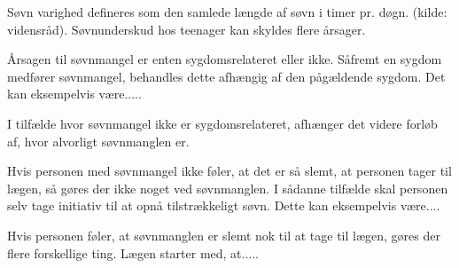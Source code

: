 

Søvn varighed defineres som den samlede længde af søvn i timer pr. døgn. (kilde: vidensråd). 
Søvnunderskud hos teenager kan skyldes flere årsager. 



Årsagen til søvnmangel er enten sygdomsrelateret eller ikke. Såfremt en sygdom medfører søvnmangel, behandles dette afhængig af den pågældende sygdom. Det kan eksempelvis være.....

I tilfælde hvor søvnmangel ikke er sygdomsrelateret, afhænger det videre forløb af, hvor alvorligt søvnmanglen er. 

Hvis personen med søvnmangel ikke føler, at det er så slemt, at personen tager til lægen, så gøres der ikke noget ved søvnmanglen. I sådanne tilfælde skal personen selv tage initiativ til at opnå tilstrækkeligt søvn. Dette kan eksempelvis være....

Hvis personen føler, at søvnmanglen er slemt nok til at tage til lægen, gøres der flere forskellige ting. Lægen starter med, at.....

